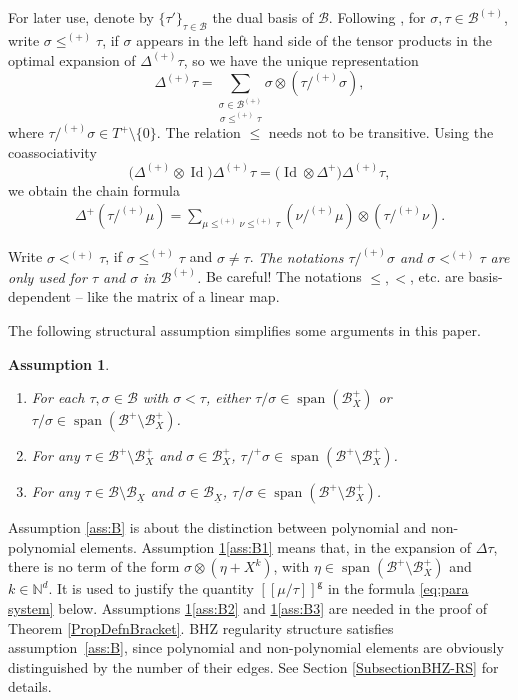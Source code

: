 \documentclass[10pt]{amsart}
\DeclareMathOperator{\Span}{span}
\theoremstyle{plain}
\newtheorem{assumption}{Assumption}
\theoremstyle{definition}
\DeclareMathOperator{\iden}{Id}
\newcommand{\Brac}[1]{[\![#1]\!]}
\newcommand{\sfg}{\mathsf{g}}
\newcommand{\bbN}{\mathbb{N}}
\newcommand{\mcB}{\mathcal{B}}
\begin{document}
For later use, denote by $\{\tau'\}_{\tau\in\mcB}$ the dual basis of $\mcB$. Following \cite{BH}, for $\sigma,\tau\in\mcB^{(+)}$, write $\sigma\le^{(+)}\tau$, if $\sigma$ appears in the left hand side of the tensor products in the optimal expansion of $\Delta^{(+)}\tau$, so we have the unique representation
\[
\Delta^{(+)}\tau = \underset{\sigma\le^{(+)}\tau}{\sum_{\sigma\in\mcB^{(+)}}} \sigma\otimes(\tau/^{(+)}\sigma),
\]
where $\tau/^{(+)}\sigma\in T^+\setminus\{0\}$.
The relation $\le$ needs not to be transitive. Using the coassociativity
\[
\bigl(\Delta^{(+)}\otimes\iden \bigr)\Delta^{(+)}\tau = \bigl(\iden \otimes\Delta^+\bigr)\Delta^{(+)}\tau,
\]
we obtain the chain formula
\begin{align}\label{chain formula}
\Delta^{+}(\tau/^{(+)}\mu)=\sum_{\mu\le^{(+)}\nu\le^{(+)}\tau}(\nu/^{(+)}\mu)\otimes(\tau/^{(+)}\nu).
\end{align}

Write $\sigma<^{(+)}\tau$, if $\sigma\le^{(+)}\tau$ and $\sigma\neq\tau$.
{\it The notations $\tau/^{(+)}\sigma$ and $\sigma<^{(+)}\tau$ are only used for $\tau$ and $\sigma$ in $\mcB^{(+)}$.} Be careful! The notations $\leq, <$, etc. are basis-dependent -- like the matrix of a linear map.

The following structural assumption simplifies some arguments in this paper.

\skpt
\begin{assumption}\label{ass:B}
\begin{enumerate}
\item\label{ass:B1} For each $\tau,\sigma\in\mcB$ with $\sigma<\tau$, either $\tau/\sigma\in\Span (\mcB_X^+)$ or $\tau/\sigma\in\Span (\mcB^+\setminus\mcB_X^+)$.
\item\label{ass:B2} For any $\tau\in\mcB^+\setminus\mcB_X^+$ and $\sigma\in\mcB_X^+$, $\tau/^+\sigma\in\Span (\mcB^+\setminus\mcB_X^+)$.
\item\label{ass:B3} For any $\tau\in\mcB\setminus\mcB_{\underline{X}}$ and $\sigma\in\mcB_{\underline{X}}$, $\tau/\sigma\in\Span (\mcB^+\setminus\mcB_X^+)$.
\end{enumerate}
\end{assumption}

Assumption \eqref{ass:B} is about the distinction between polynomial and non-polynomial elements.
Assumption \ref{ass:B}\eqref{ass:B1} means that, in the expansion of $\Delta\tau$, there is no term of the form $\sigma\otimes (\eta+X^k)$, with $\eta\in\Span (\mcB^+\setminus\mcB_X^+)$ and $k\in\bbN^d$. It is used to justify the quantity $\Brac{\mu/\tau}^{\sfg}$ in the formula \eqref{eq:para system} below.
Assumptions \ref{ass:B}\eqref{ass:B2} and \ref{ass:B}\eqref{ass:B3} are needed in the proof of Theorem \ref{PropDefnBracket}.
BHZ regularity structure satisfies assumption~\eqref{ass:B}, since polynomial and non-polynomial elements are obviously distinguished by the number of their edges. See Section \ref{SubsectionBHZ-RS} for details.
\end{document}
